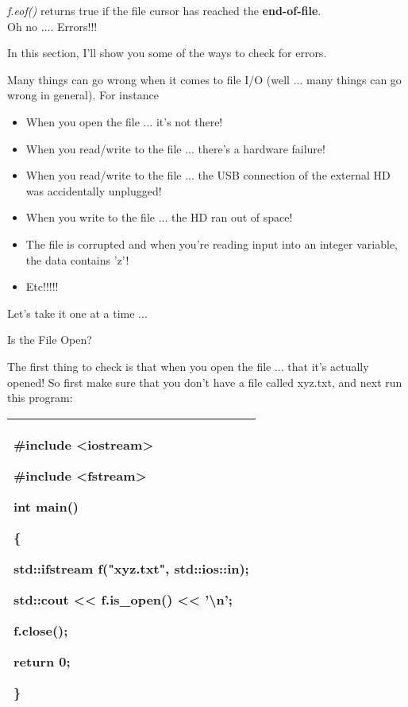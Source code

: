 \documentclass[
]{article}
\providecommand{\tightlist}{%
  \setlength{\itemsep}{0pt}\setlength{\parskip}{0pt}}
\begin{document}
\emph{f.eof()} returns true if the file cursor has reached the
\textbf{end-of-file}.\\

Oh no .... Errors!!!

In this section, I'll show you some of the ways to check for errors.

Many things can go wrong when it comes to file I/O (well ... many things
can go wrong in general). For instance

\begin{itemize}
\tightlist
\item
  When you open the file ... it's not there!
\item
  When you read/write to the file ... there's a hardware failure!
\item
  When you read/write to the file ... the USB connection of the external
  HD was accidentally unplugged!
\item
  When you write to the file ... the HD ran out of space!
\item
  The file is corrupted and when you're reading input into an integer
  variable, the data contains 'z'!
\item
  Etc!!!!!
\end{itemize}

Let's take it one at a time ...

Is the File Open?

The first thing to check is that when you open the file ... that it's
actually opened! So first make sure that you don't have a file called
xyz.txt, and next run this program:

\begin{longtable}[]{@{}l@{}}
\toprule
\endhead
\begin{minipage}[t]{0.97\columnwidth}\raggedright
\#include \textless iostream\textgreater{}

\#include \textless fstream\textgreater{}

int main()

\{

std::ifstream f("xyz.txt", std::ios::in);

std::cout \textless\textless{} \textbf{f.is\_open()}
\textless\textless{} '\textbackslash n';

f.close();

return 0;

\}\strut
\end{minipage}\tabularnewline
\bottomrule
\end{longtable}
\end{document}
